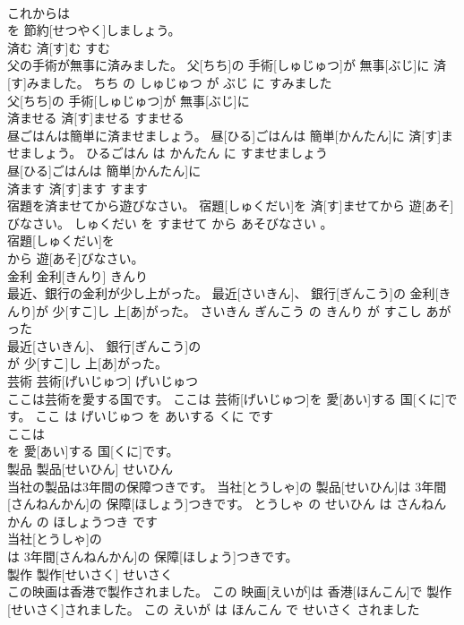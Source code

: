 \documentclass[8pt]{extreport}
\begin{document}
\begin{CJK}{UTF8}{min}
\\	これからは
\\	を 節約[せつやく]しましょう。			
\\	済む	済[す]む	すむ	
\\	父の手術が無事に済みました。	父[ちち]の 手術[しゅじゅつ]が 無事[ぶじ]に 済[す]みました。	ちち の しゅじゅつ が ぶじ に すみました	
\\	父[ちち]の 手術[しゅじゅつ]が 無事[ぶじ]に
\\	済ませる	済[す]ませる	すませる	
\\	昼ごはんは簡単に済ませましょう。	昼[ひる]ごはんは 簡単[かんたん]に 済[す]ませましょう。	ひるごはん は かんたん に すませましょう	
\\	昼[ひる]ごはんは 簡単[かんたん]に
\\	済ます	済[す]ます	すます	
\\	宿題を済ませてから遊びなさい。	宿題[しゅくだい]を 済[す]ませてから 遊[あそ]びなさい。	しゅくだい を すませて から あそびなさい 。	
\\	宿題[しゅくだい]を
\\	から 遊[あそ]びなさい。			
\\	金利	金利[きんり]	きんり	
\\	最近、銀行の金利が少し上がった。	最近[さいきん]、 銀行[ぎんこう]の 金利[きんり]が 少[すこ]し 上[あ]がった。	さいきん ぎんこう の きんり が すこし あがった	
\\	最近[さいきん]、 銀行[ぎんこう]の
\\	が 少[すこ]し 上[あ]がった。			
\\	芸術	芸術[げいじゅつ]	げいじゅつ	
\\	ここは芸術を愛する国です。	ここは 芸術[げいじゅつ]を 愛[あい]する 国[くに]です。	ここ は げいじゅつ を あいする くに です	
\\	ここは
\\	を 愛[あい]する 国[くに]です。			
\\	製品	製品[せいひん]	せいひん	
\\	当社の製品は3年間の保障つきです。	当社[とうしゃ]の 製品[せいひん]は 3年間[さんねんかん]の 保障[ほしょう]つきです。	とうしゃ の せいひん は さんねんかん の ほしょうつき です	
\\	当社[とうしゃ]の
\\	は 3年間[さんねんかん]の 保障[ほしょう]つきです。			
\\	製作	製作[せいさく]	せいさく	
\\	この映画は香港で製作されました。	この 映画[えいが]は 香港[ほんこん]で 製作[せいさく]されました。	この えいが は ほんこん で せいさく されました	

\end{CJK}
\end{document}
